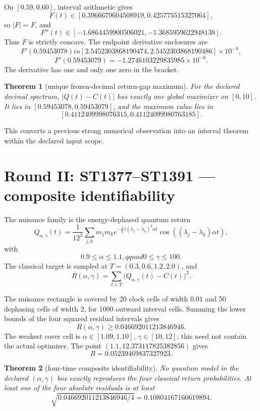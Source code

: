 \documentclass[11pt,a4paper]{article}
\newtheorem{theorem}{Theorem}\newtheorem{proposition}[theorem]{Proposition}
\begin{document}
On $[0.59,0.60]$, interval arithmetic gives
\[
F(t)\in[0.3966679604508919,0.425775515327064],
\]
so $|F|=F$, and
\[
F''(t)\in[-1.6864459900506021,-1.3685959622948138].
\]
Thus $F$ is strictly concave.  The endpoint derivative enclosures are
\[
F'(0.59453078)in
[2.5452303868190474,2.5452303868190486]\times10^{-9},
\]
\[
F'(0.59453079)=
-1.2746103229835985\times10^{-8}.
\]
The derivative has one and only one zero in the bracket.

\begin{theorem}[unique frozen-decimal return-gap maximum]
For the declared decimal spectrum, $|Q(t)-C(t)|$ has exactly one global
maximizer on $[0,10]$.  It lies in
$[0.59453078,0.59453079]$, and the maximum value lies in
\[
[0.4112409998076315,0.41124099980763185].
\]
\end{theorem}

This converts a previous strong numerical observation into an interval theorem
within the declared input scope.

\section{Round II: ST1377--ST1391 --- composite identifiability}

The nuisance family is the energy-dephased quantum return
\[
Q_{\alpha,\gamma}(t)=\frac1{12^2}\sum_{j,k}m_jm_k
e^{-\frac12\gamma(\lambda_j-\lambda_k)^2\alpha t}
\cos((\lambda_j-\lambda_k)\alpha t),
\]
with
\[
0.9\le\alpha\le1.1,qquad0\le\gamma\le100.
\]
The classical target is sampled at
$T=(0.3,0.6,1.2,2.0)$, and
\[
R(\alpha,\gamma)=\sum_{t\in T}
\bigl(Q_{\alpha,\gamma}(t)-C(t)\bigr)^2.
\]

The nuisance rectangle is covered by 20 clock cells of width $0.01$ and 50
dephasing cells of width $2$, for 1000 outward interval cells.  Summing the
lower bounds of the four squared residual intervals gives
\[
\boxed{R(\alpha,\gamma)\ge0.046692011213846946.}
\]
The weakest cover cell is
$\alpha\in[1.09,1.10]$, $\gamma\in[10,12]$; this need not contain the actual
optimizer.  The point $(1.1,12.373117825382856)$ gives
\[
R=0.05239469837327923.
\]

\begin{theorem}[four-time composite identifiability]
No quantum model in the declared $(\alpha,\gamma)$ box exactly reproduces the
four classical return probabilities.  At least one of the four absolute
residuals is at least
\[
\sqrt{0.046692011213846946/4}
=0.10804167160619894.
\]
\end{theorem}
\end{document}
